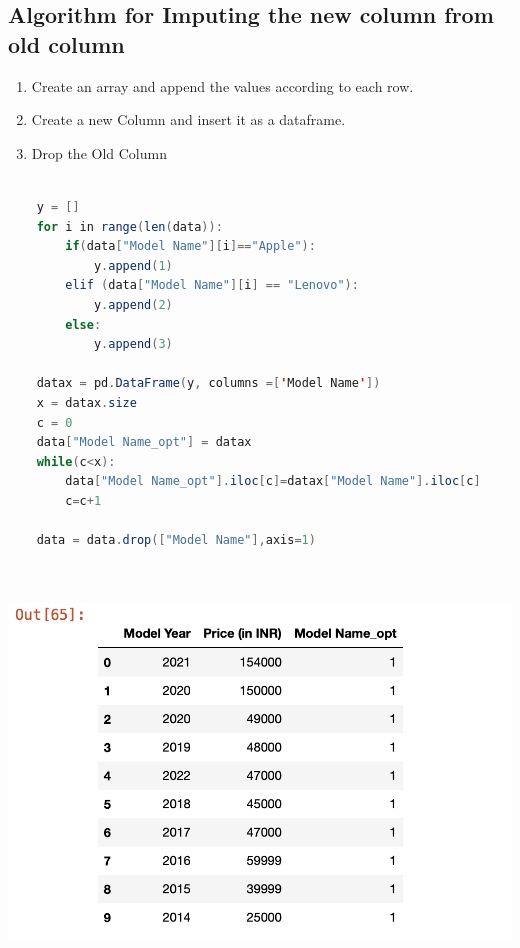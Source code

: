 \documentclass{article}
\begin{document}
\subsection{Algorithm for Imputing the new column from old column}
\begin{enumerate}
	\item Create an array and append the values according to each row.
	\item Create a new Column and insert it as a dataframe.
	\item Drop the Old Column
\end{enumerate}

\begin{lstlisting}[language=Java]
	
	y = []
	for i in range(len(data)):
		if(data["Model Name"][i]=="Apple"):
			y.append(1)
		elif (data["Model Name"][i] == "Lenovo"):
			y.append(2)
		else:
			y.append(3)
	
	datax = pd.DataFrame(y, columns =['Model Name'])
	x = datax.size
	c = 0
	data["Model Name_opt"] = datax
	while(c<x):
		data["Model Name_opt"].iloc[c]=datax["Model Name"].iloc[c]
		c=c+1
	
	data = data.drop(["Model Name"],axis=1)
	
	
\end{lstlisting}
\includegraphics[scale=0.85]{images/3.png}\\\\\\
\end{document}
